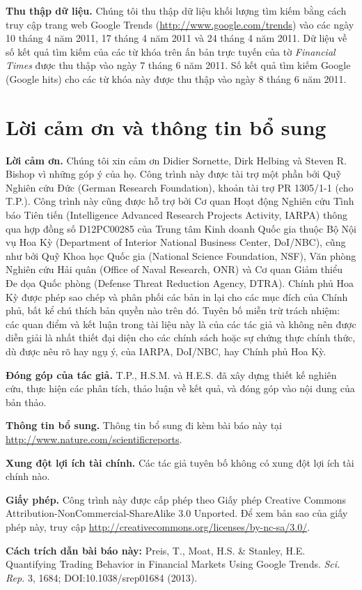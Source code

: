\textbf{Thu thập dữ liệu.} Chúng tôi thu thập dữ liệu khối lượng tìm kiếm bằng cách truy cập trang web Google Trends (\url{http://www.google.com/trends}) vào các ngày 10 tháng 4 năm 2011, 17 tháng 4 năm 2011 và 24 tháng 4 năm 2011. Dữ liệu về số kết quả tìm kiếm của các từ khóa trên ấn bản trực tuyến của tờ \emph{Financial Times} được thu thập vào ngày 7 tháng 6 năm 2011. Số kết quả tìm kiếm Google (Google hits) cho các từ khóa này được thu thập vào ngày 8 tháng 6 năm 2011.

\section{Lời cảm ơn và thông tin bổ sung}

\textbf{Lời cảm ơn.} Chúng tôi xin cảm ơn Didier Sornette, Dirk Helbing và Steven R. Bishop vì những góp ý của họ. Công trình này được tài trợ một phần bởi Quỹ Nghiên cứu Đức (German Research Foundation), khoản tài trợ PR 1305/1-1 (cho T.P.). Công trình này cũng được hỗ trợ bởi Cơ quan Hoạt động Nghiên cứu Tình báo Tiên tiến (Intelligence Advanced Research Projects Activity, IARPA) thông qua hợp đồng số D12PC00285 của Trung tâm Kinh doanh Quốc gia thuộc Bộ Nội vụ Hoa Kỳ (Department of Interior National Business Center, DoI/NBC), cũng như bởi Quỹ Khoa học Quốc gia (National Science Foundation, NSF), Văn phòng Nghiên cứu Hải quân (Office of Naval Research, ONR) và Cơ quan Giảm thiểu Đe dọa Quốc phòng (Defense Threat Reduction Agency, DTRA). Chính phủ Hoa Kỳ được phép sao chép và phân phối các bản in lại cho các mục đích của Chính phủ, bất kể chú thích bản quyền nào trên đó. Tuyên bố miễn trừ trách nhiệm: các quan điểm và kết luận trong tài liệu này là của các tác giả và không nên được diễn giải là nhất thiết đại diện cho các chính sách hoặc sự chứng thực chính thức, dù được nêu rõ hay ngụ ý, của IARPA, DoI/NBC, hay Chính phủ Hoa Kỳ.

\textbf{Đóng góp của tác giả.} T.P., H.S.M. và H.E.S. đã xây dựng thiết kế nghiên cứu, thực hiện các phân tích, thảo luận về kết quả, và đóng góp vào nội dung của bản thảo.

\textbf{Thông tin bổ sung.} Thông tin bổ sung đi kèm bài báo này tại \url{http://www.nature.com/scientificreports}.

\textbf{Xung đột lợi ích tài chính.} Các tác giả tuyên bố không có xung đột lợi ích tài chính nào.

\textbf{Giấy phép.} Công trình này được cấp phép theo Giấy phép Creative Commons Attribution-NonCommercial-ShareAlike 3.0 Unported. Để xem bản sao của giấy phép này, truy cập \url{http://creativecommons.org/licenses/by-nc-sa/3.0/}.

\textbf{Cách trích dẫn bài báo này:} Preis, T., Moat, H.S. \& Stanley, H.E. Quantifying Trading Behavior in Financial Markets Using Google Trends. \emph{Sci. Rep.} 3, 1684; DOI:10.1038/srep01684 (2013).

